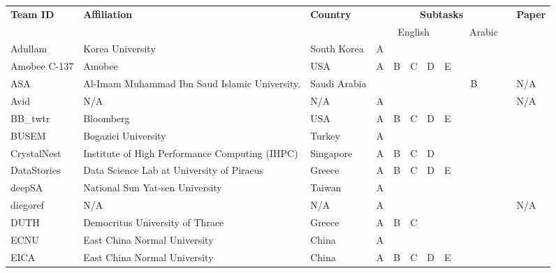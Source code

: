 \begin{table}[h!]
\centering
\begin{scriptsize}
\setlength{\tabcolsep}{3pt}
\begin{tabular}{|l|p{4.5cm}|p{1.8cm} | lllll | lllll |p{3.8cm}|}
\hline
\multirow{2}{*}{\bf Team ID}	&	\multirow{2}{*}{\bf Affiliation}	&	\multirow{2}{*}{\bf Country}	&	\multicolumn{10}{c|}{\bf Subtasks}		&	\multirow{2}{*}{\bf Paper} \\
	&		&		&	\multicolumn{5}{c|}{English} &	\multicolumn{5}{c|}{Arabic} & \\ \hline
    \hline
Adullam	&	Korea University	&	South Korea	&	A	&		&		&		&		&		&		&		&		&		&	\cite{SemEval:2017:task4:adullam}	\\
\hline
Amobee C-137	&	Amobee	&	USA	&	A	&	B	&	C	&	D	&	E	&		&		&		&		&		&	\cite{SemEval:2017:task4:Amobee}\\
\hline
ASA	&	Al-Imam Muhammad Ibn Saud Islamic University.	&	Saudi Arabia	&		&		&		&		&		&		&	B	&		&		&		&	N/A	\\
\hline
Avid	&	N/A	&	N/A	&	A	&		&		&		&		& 		&		&		&		&		&	N/A	\\
\hline
BB\_twtr	&	Bloomberg	&	USA	&	A	&	B	&	C	&	D	&	E	&		&		&		&		&		&	\cite{SemEval:2017:task4:BB_twtr}\\
\hline
BUSEM 	&	Bogazici University	&	Turkey	&	A	&		&		&		&		&		&		&		&		&		&	\cite{SemEval:2017:task4:busem}\\
\hline
CrystalNest	&	Institute of High Performance Computing (IHPC) 	&	Singapore	&	A	&	B	&	C	&	D	&		&		&		&		&		&		&	\cite{SemEval:2017:task4:CrystalNest}\\
\hline
DataStories	&	Data Science Lab at University of Piraeus	&	Greece	&	A	&	B	&	C	&	D	&	E	&		&		&		&		&		&		\cite{SemEval:2017:task4:datastories} \\
\hline
deepSA	&	National Sun Yat-sen University	&	Taiwan	&	A	&		&		&		&		&		&		&		&		&		&	\cite{SemEval:2017:task4:deepSA}\\
\hline
diegoref	&	N/A	&	N/A	&	A	&		&		&		&		& 		&		&		&		&		&	N/A	\\
\hline
DUTH	&	Democritus University of Thrace	&	Greece	&	A	&	B	&	C	&		&		&		&		&		&		&		&	\cite{SemEval:2017:task4:duth}\\
\hline
ECNU	&	East China Normal University	&	China	&	A	&		&		&		&		&		&		&		&		&		&	\cite{SemEval:2017:task4:ecnu} \\
\hline
EICA	&	East China Normal University	&	China	&	A	&	B	&	C	&	D	&	E	&		&		&		&		&		&	\cite{SemEval:2017:task4:eica} \\

\end{tabular}
\end{scriptsize}
\end{table}
